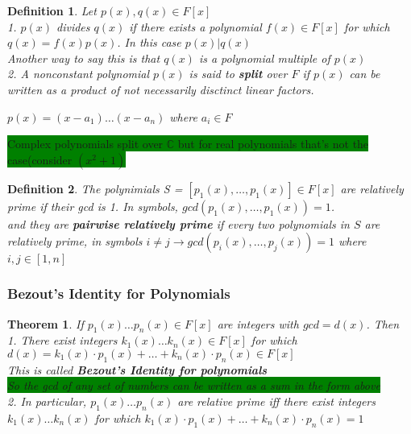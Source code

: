 \documentclass [12pt]{article}
\newtheorem {theorem}{Theorem}
\newtheorem {definition}{Definition}
\begin{document}
\begin {definition}
 Let $p(x),q(x)\in F[x]$\\
1. $p(x)$ divides $q(x)$ if there exists a polynomial $f(x)\in F[x]$ for
which $q(x)=f(x)p(x)$. In this case $p(x)|q(x)$\\
Another way to say this is that $q(x)$ is a polynomial multiple of $p(x)$\\
2. A nonconstant polynomial $p(x)$ is said to \textbf{split} over $F$ if
$p(x)$ can be written as a product of not necessarily disctinct linear factors.

\(p(x)=(x-a_1)\ldots (x-a_n)\) where $a_i\in F$ 
\end {definition}
 \colorbox {green}{Complex polynomials split over ${\mathbb{C}}$ but for
real polynomials that's not the case(consider $(x^2+1)$} 

\begin {definition}
 The polynimials S = $[p_{1}(x),\ldots ,p_{1}(x)]\in F[x]$ are relatively
prime if their gcd is 1. In symbols, $gcd(p_{1}(x),\ldots ,p_{1}(x))=1$.\\
and they are \textbf{pairwise relatively prime} if every two polynomials
in $S$ are relatively prime, in symbols $i\neq j\rightarrow gcd(p_{i}(x),\ldots ,p_{j}(x))=1$
where $i,j\in [1,n]$ 
\end {definition}
 


\subsubsection {Bezout's Identity for Polynomials} 
\begin {theorem}
 If \(p_{1}(x)\ldots p_{n}(x)\in F[x]\) are integers with $gcd=d(x)$. Then\\
1. There exist integers \(k_{1}(x)\ldots k_{n}(x)\in F[x]\) for which \\
\(d(x)=k_{1}(x)\cdot p_{1}(x)+\ldots +k_{n}(x)\cdot p_{n}(x)\in F[x]\)\\
This is called \textbf{Bezout's Identity for polynomials}\\
\colorbox {green}{So the gcd of any set of numbers can be written as a sum
in the form above}\\
2. In particular, \(p_{1}(x)\ldots p_{n}(x)\) are relative prime iff there
exist integers \(k_{1}(x)\ldots k_{n}(x)\) for which \(k_{1}(x)\cdot p_{1}(x)+\ldots +k_{n}(x)\cdot p_{n}(x)=1\)
\\
\end {theorem}
 
\end{document}
